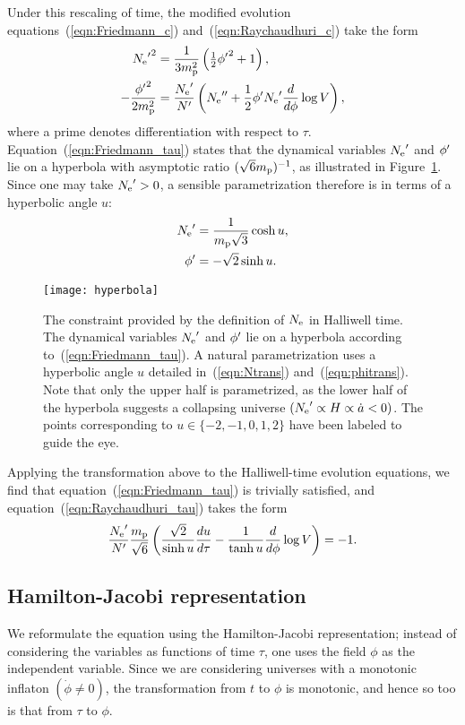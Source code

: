 Under this rescaling of time, the modified evolution equations~(\ref{eqn:Friedmann_c}) and~(\ref{eqn:Raychaudhuri_c}) take the form
%
\begin{align}
  {{N_\mathrm{e}}^\prime}^2 
  &= 
  \frac{1}{3m_{\mathrm{p}}^2}\left({\textstyle\frac{1}{2}}{{\phi}^\prime}^2 + 1 \right),
  \label{eqn:Friedmann_tau} 
  \\
  -\frac{{{\phi}^\prime}^2}{2m_{\mathrm{p}}^2} 
  &= 
  \frac{{{N_\mathrm{e}}^\prime}}{{{N}^\prime}}\left({{N_\mathrm{e}}^{\prime\prime}} 
  +\frac{1}{2} {{\phi}^\prime}{{N_\mathrm{e}}^\prime} \frac{d}{d\phi}\log V \right),  
  \label{eqn:Raychaudhuri_tau}
\end{align}
%
where a prime denotes differentiation with respect to $\tau$.  Equation~(\ref{eqn:Friedmann_tau}) states that the dynamical variables ${{N_\mathrm{e}}^\prime}$ and ${{\phi}^\prime}$ lie on a hyperbola with asymptotic ratio $(\sqrt{6}m_{\mathrm{p}})^{-1}$, as illustrated in Figure~\ref{fig:figure_hyperbola}. Since one may take ${{N_\mathrm{e}}^\prime}>0$, a sensible parametrization therefore is in terms of a hyperbolic angle $u$:
%
\begin{align}
  {{N_\mathrm{e}}^\prime} 
  &= 
  \frac{1}{m_{\mathrm{p}}\sqrt{3}}\cosh u,
  \label{eqn:Ntrans}
  \\
  {{\phi}^\prime} 
  &= 
  -\sqrt{2}\sinh u.
  \label{eqn:phitrans}
\end{align}
%
%
\begin{figure}
  \texttt{[image: hyperbola]}
  \caption{The constraint provided by the definition of $N_\mathrm{e}$ in Halliwell time. The dynamical variables ${{N_\mathrm{e}}^\prime}$ and ${{\phi}^\prime}$ lie on a hyperbola according to~\protect(\ref{eqn:Friedmann_tau}). A natural parametrization uses a hyperbolic angle $u$ detailed in~\protect(\ref{eqn:Ntrans}) and~\protect(\ref{eqn:phitrans}). Note that only the upper half is parametrized, as the lower half of the hyperbola suggests a collapsing universe $({{N_\mathrm{e}}^\prime}\propto H\propto\dot{a}<0)$. The points corresponding to $u\in\{-2,-1,0,1,2\}$ have been labeled to guide the eye.} \label{fig:figure_hyperbola}
\end{figure}
%
Applying the transformation above to the Halliwell-time evolution equations, we find that equation~(\ref{eqn:Friedmann_tau}) is trivially satisfied, and equation~(\ref{eqn:Raychaudhuri_tau}) takes the form
%
\begin{equation}
  \frac{{{N_\mathrm{e}}^\prime}}{{{N}^\prime}} \frac{m_{\mathrm{p}}}{\sqrt{6}}
  \left(\frac{\sqrt{2}}{\sinh u} \frac{du}{d\tau} 
  - \frac{1}{\tanh u} \frac{d}{d\phi}\log V\right) 
  = -1.
  \label{eqn:master_tau}
\end{equation}
%

\subsection{Hamilton-Jacobi representation}
\label{sec:Hamilton-Jacobi_representations}
We reformulate the equation using the Hamilton-Jacobi representation; instead of considering the variables as functions of time $\tau$, one uses the field $\phi$ as the independent variable. Since we are considering universes with a monotonic inflaton $(\dot{\phi}\ne 0)$, the transformation from $t$ to $\phi$ is monotonic, and hence so too is that from $\tau$ to $\phi$.

